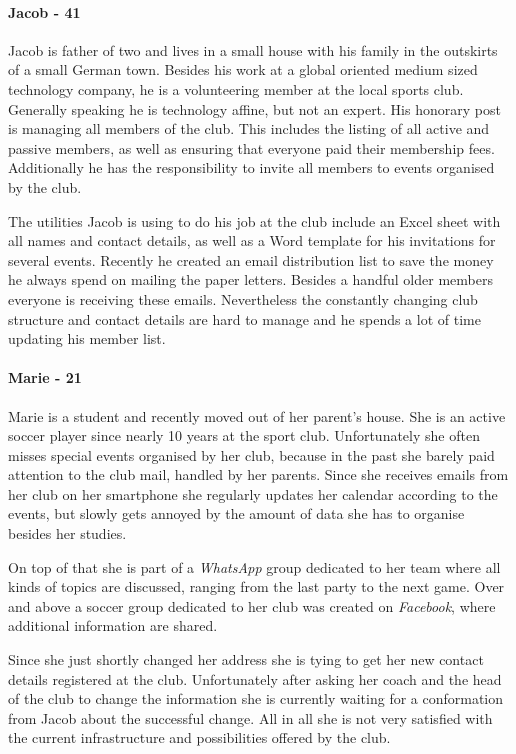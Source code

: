 \paragraph{Jacob - 41}
\label{sec:Jacob}

Jacob is father of two and lives in a small house with his family in the outskirts of a small German town. Besides his work at a global oriented medium sized technology company, he is a volunteering member at the local sports club. Generally speaking he is technology affine, but not an expert. His honorary post is managing all members of the club. This includes the listing of all active and passive members, as well as ensuring that everyone paid their membership fees. Additionally he has the responsibility to invite all members to events organised by the club. 

The utilities Jacob is using to do his job at the club include an Excel sheet with all names and contact details, as well as a Word template for his invitations for several events. Recently he created an email distribution list to save the money he always spend on mailing the paper letters. Besides a handful older members everyone is receiving these emails. Nevertheless the constantly changing club structure and contact details are hard to manage and he spends a lot of time updating his member list.

\paragraph{Marie - 21}
Marie is a student and recently moved out of her parent's house. She is an active soccer player since nearly 10 years at the sport club. Unfortunately she often misses special events organised by her club, because in the past she barely paid attention to the club mail, handled by her parents. Since she receives emails from her club on her smartphone she regularly updates her calendar according to the events, but slowly gets annoyed by the amount of data she has to organise besides her studies.

On top of that she is part of a \emph{WhatsApp} group dedicated to her team where all kinds of topics are discussed, ranging from the last party to the next game. Over and above a soccer group dedicated to her club was created on \emph{Facebook}, where additional information are shared.

Since she just shortly changed her address she is tying to get her new contact details registered at the club. Unfortunately after asking her coach and the head of the club to change the information she is currently waiting for a conformation from Jacob about the successful change. All in all she is not very satisfied with the current infrastructure and possibilities offered by the club.


